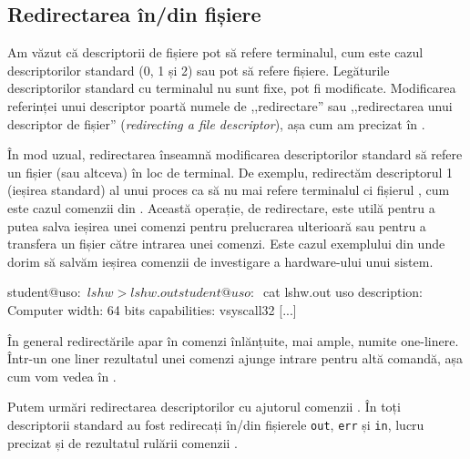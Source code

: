 \subsection{Redirectarea în/din fișiere}
\label{sec:process:redirect}

Am văzut că descriptorii de fișiere pot să refere terminalul, cum este cazul descriptorilor standard (0, 1 și 2) sau pot să refere fișiere.
Legăturile descriptorilor standard cu terminalul nu sunt fixe, pot fi modificate.
Modificarea referinței unui descriptor poartă numele de ,,redirectare'' sau ,,redirectarea unui descriptor de fișier'' (\textit{redirecting a file descriptor}), așa cum am precizat în .

În mod uzual, redirectarea înseamnă modificarea descriptorilor standard să refere un fișier (sau altceva) în loc de terminal.
De exemplu, redirectăm descriptorul 1 (ieșirea standard) al unui proces ca să nu mai refere terminalul ci fișierul , cum este cazul comenzii din .
Această operație, de redirectare, este utilă pentru a putea salva ieșirea unei comenzi pentru prelucrarea ulterioară sau pentru a transfera un fișier către intrarea unei comenzi.
Este cazul exemplului din  unde dorim să salvăm ieșirea comenzii de investigare a hardware-ului unui sistem.

\begin{screen}[caption={Redirectarea ieșirii standard (stdout)},label={lst:process:redirect-stdout}]
student@uso:~$ lshw > lshw.out
student@uso:~$ cat lshw.out
uso
    description: Computer
    width: 64 bits
    capabilities: vsyscall32
[...]
\end{screen}

În general redirectările apar în comenzi înlănțuite, mai ample, numite one-linere.
Într-un one liner rezultatul unei comenzi ajunge intrare pentru altă comandă, așa cum vom vedea în .

Putem urmări redirectarea descriptorilor cu ajutorul comenzii .
În  toți descriptorii standard au fost redirecați în/din fișierele \texttt{out}, \texttt{err} și \texttt{in}, lucru precizat și de rezultatul rulării comenzii .

